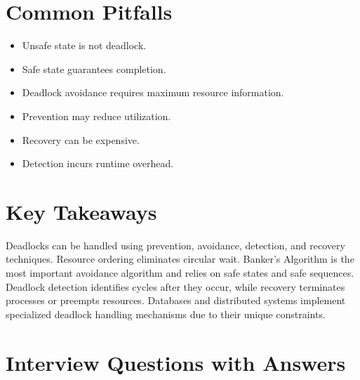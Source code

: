 \section{Common Pitfalls}

\begin{itemize}
\item Unsafe state is not deadlock.
\item Safe state guarantees completion.
\item Deadlock avoidance requires maximum resource information.
\item Prevention may reduce utilization.
\item Recovery can be expensive.
\item Detection incurs runtime overhead.
\end{itemize}

\section{Key Takeaways}

\begin{keytakeaways}
Deadlocks can be handled using prevention, avoidance, detection, and recovery techniques. Resource ordering eliminates circular wait. Banker's Algorithm is the most important avoidance algorithm and relies on safe states and safe sequences. Deadlock detection identifies cycles after they occur, while recovery terminates processes or preempts resources. Databases and distributed systems implement specialized deadlock handling mechanisms due to their unique constraints.
\end{keytakeaways}

\section{Interview Questions with Answers}


